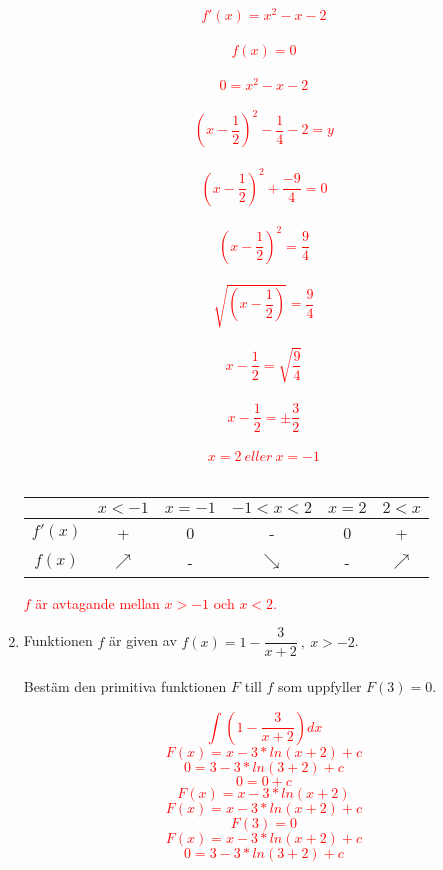 \documentclass[12pt, letterpaper, twoside]{article}
\begin{document}
\begin{flushleft}
\begin{enumerate}[label=\textbf{\arabic*)}]
   \textcolor{red}{
      $$ f'(x) = x^2 - x - 2 $$\\
      $$ f(x) = 0 $$\\
      $$ 0 = x^2 - x - 2 $$\\
      $$ (x-\frac{1}{2})^2 - \frac{1}{4}-2 = y $$\\
      $$ (x-\frac{1}{2})^2 + \frac{-9}{4} = 0 $$\\
      $$ (x-\frac{1}{2})^2 = \frac{9}{4} $$\\
      $$ \sqrt{(x-\frac{1}{2})} = \frac{9}{4} $$\\
      $$ x-\frac{1}{2} = \sqrt{\frac{9}{4}} $$\\
      $$ x-\frac{1}{2} = \pm\frac{3}{2} $$\\
      $$ x = 2\ eller\ x=-1 $$
      \hfill\\
    \begin{center}
        \begin{tabular}{ |c|c|c|c|c|c| }
           \hline
                     & $ x<-1 $ & $ x=-1 $ & $ -1<x<2 $ & $ x=2 $ & $ 2 < x $  \\
           \hline
           $ f'(x) $ &    +     & 0        & -          & 0       &  +         \\
           \hline
           $ f(x) $  & $\nearrow$ & -      & $\searrow$ & -       & $\nearrow$ \\
           \hline
        \end{tabular}
    \end{center}
    $ f $ är avtagande mellan $ x>-1 $ och $ x<2 $.
   }

   \hfill

   \item
   Funktionen $ f $ är given av $ f(x)=1-\dfrac{3}{x+2}\ ,\ x>-2 $.\\
   \hfill\\
   Bestäm den primitiva funktionen $ F $ till $ f $ som uppfyller $ F(3)=0 $.

   \textcolor{red}{
      $$  \int(1-\frac{3}{x+2})dx $$
      $$ F(x) = x-3*ln(x+2) + c $$
      $$ 0 = 3-3*ln(3+2) + c $$
      $$ 0 = 0 + c $$
      $$ F(x) = x-3*ln(x+2) $$
      $$ F(x) =  x- 3*ln(x+2) + c $$
      $$ F(3) =0  $$
    $$ F(x) =x- 3*ln(x+2) + c $$
    $$ 0 = 3-3*ln(3+2) + c $$
   }


\end{enumerate}
\end{flushleft}
\end{document}
